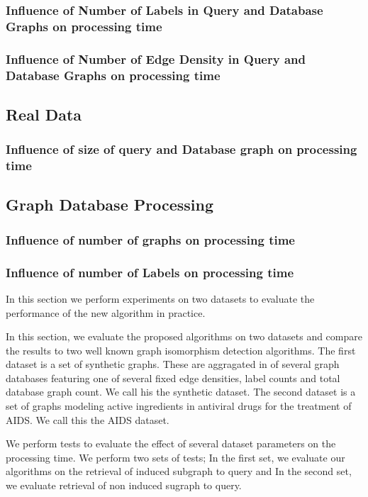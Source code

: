 \subsubsection{Influence of Number of Labels in Query and Database Graphs on processing time}

\subsubsection{Influence of Number of Edge Density in Query and Database Graphs on processing time}

\subsection{Real Data}

\subsubsection{Influence of size of query and Database graph on processing time}

\subsection{Graph Database Processing}

\subsubsection{Influence of number of graphs on processing time}

\subsubsection{Influence of number of Labels on processing time}

In this section we perform experiments on two datasets to evaluate the performance of the new algorithm in practice.

In this section, we evaluate the proposed algorithms on two datasets and compare the results to two well known graph isomorphism detection algorithms. The first dataset is a set of synthetic graphs. These are aggragated in of several graph databases featuring one of several fixed edge densities, label counts and total database graph count. We call his the synthetic dataset. The second dataset is  a set of graphs modeling active ingredients in antiviral drugs for the treatment of AIDS. We call this the AIDS dataset. 

We perform tests to evaluate the effect of several dataset parameters on the processing time.
We perform two sets of tests; In the first set, we evaluate our algorithms on the retrieval of induced subgraph to query and In the second set, we evaluate retrieval of non induced sugraph to query.

